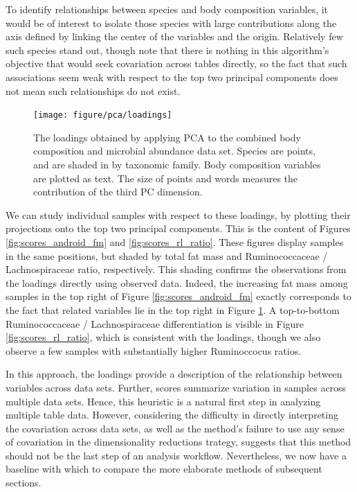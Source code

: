 \documentclass[14pt]{extarticle}
\begin{document}
To identify relationships between species and body composition variables, it would
be of interest to isolate those species with large contributions along the axis
defined by linking the center of the  variables and the origin. Relatively
few such species stand out, though note that there is nothing in this
algorithm's objective that would seek covariation across tables directly, so the
fact that such associations seem weak with respect to the top two principal
components does not mean such relationships do not exist.

\begin{figure}
  \centering
  \texttt{[image: figure/pca/loadings]}
  \caption{The loadings obtained by applying PCA to the combined body
    composition and microbial abundance data set. Species are points, and are
    shaded in by taxonomic family. Body composition variables are plotted as
    text. The size of points and words measures the contribution of the third PC
    dimension. \label{fig:loadings} }
\end{figure}

We can study individual samples with respect to these loadings, by plotting
their projections onto the top two principal components. This is the content of
Figures \ref{fig:scores_android_fm} and \ref{fig:scores_rl_ratio}. These figures
display samples in the same positions, but shaded by total fat mass and Ruminococcaceae
/ Lachnospiraceae ratio, respectively. This shading confirms the observations
from the loadings directly using observed data. Indeed, the increasing fat mass
among samples in the top right of Figure \ref{fig:scores_android_fm} exactly
corresponds to the fact that  related variables lie in the top right in
Figure \ref{fig:loadings}. A top-to-bottom Ruminococcaceae /
Lachnospiraceae differentiation is visible in Figure \ref{fig:scores_rl_ratio},
which is consistent with the loadings, though we also observe a few samples with
substantially higher Ruminoccocus ratios.

In this approach, the loadings provide a description of the relationship between
variables across data sets. Further, scores summarize variation in samples
across multiple data sets. Hence, this heuristic is a natural first step in
analyzing multiple table data. However, considering the difficulty in directly
interpreting the covariation across data sets, as well as the method's failure
to use any sense of covariation in the dimensionality reductions trategy,
suggests that this method should not be the last step of an analysis workflow.
Nevertheless, we now have a baseline with which to compare the more elaborate
methods of subsequent sections.
\end{document}
